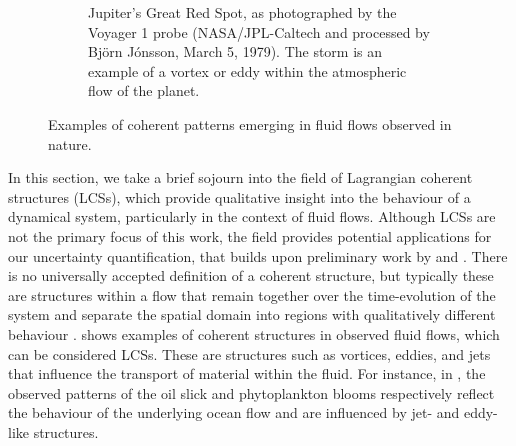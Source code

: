 \begin{figure}
\begin{subfigure}[t]{\textwidth}
			\caption{Jupiter's Great Red Spot, as photographed by the Voyager 1 probe (NASA/JPL-Caltech and processed by Bj\"{o}rn J\'{o}nsson, March 5, 1979).
			The storm is an example of a vortex or eddy within the atmospheric flow of the planet.}
		\end{subfigure}
		\caption{Examples of coherent patterns emerging in fluid flows observed in nature.}
		\label{fig:lcs_examples}
\end{figure}

In this section, we take a brief sojourn into the field of Lagrangian coherent structures (LCSs), which provide qualitative insight into the behaviour of a dynamical system, particularly in the context of fluid flows.
Although LCSs are not the primary focus of this work, the field provides potential applications for our uncertainty quantification, that builds upon preliminary work by \citet{Balasuriya_2020_StochasticSensitivityComputable,Balasuriya_2020_UncertaintyFinitetimeLyapunov} and \citet{BadzaEtAl_2023_HowSensitiveAre}.
There is no universally accepted definition of a coherent structure, but typically these are structures within a flow that remain together over the time-evolution of the system and separate the spatial domain into regions with qualitatively different behaviour \citep{BalasuriyaEtAl_2018_GeneralizedLagrangianCoherent}.
 shows examples of coherent structures in observed fluid flows, which can be considered LCSs.
These are structures such as vortices, eddies, and jets that influence the transport of material within the fluid.
For instance, in , the observed patterns of the oil slick and phytoplankton blooms respectively reflect the behaviour of the underlying ocean flow and are influenced by jet- and eddy-like structures.

